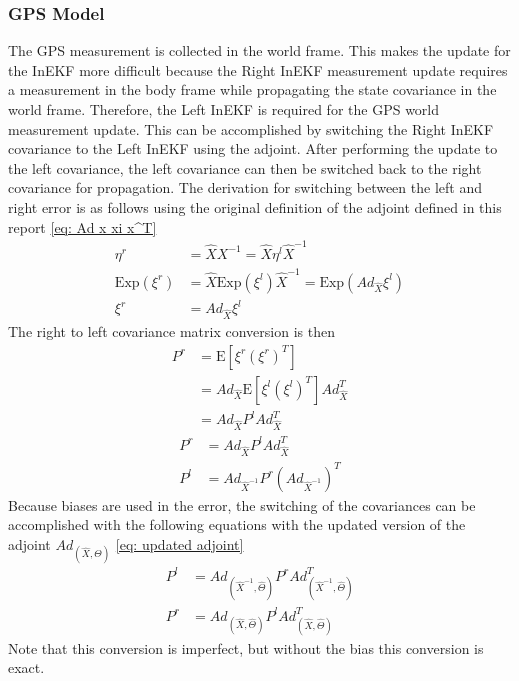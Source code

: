 \subsubsection{GPS Model}
The GPS measurement is collected in the world frame. This makes the update for the InEKF more difficult because the Right InEKF measurement update requires a measurement in the body frame while propagating the state covariance in the world frame. Therefore, the Left InEKF is required for the GPS world measurement update. This can be accomplished by switching the Right InEKF covariance to the Left InEKF using the adjoint. After performing the update to the left covariance, the left covariance can then be switched back to the right covariance for propagation. The derivation for switching between the left and right error is as follows \cite{Contact-Aided_Invarant_EKF} using the original definition of the adjoint defined in this report \eqref{eq: Ad x xi x^T} 
\begin{equation}
    \begin{split}
        \eta^r &= \hat{X} X^{-1} = \hat{X} \eta^l \hat{X}^{-1} \\
        \text{Exp}(\xi^r) &= \hat{X} \text{Exp}(\xi^l) \hat{X}^{-1} = \text{Exp}(Ad_{\hat{X}} \xi^l) \\
        \xi^r &= Ad_{\hat{X}} \xi^l
    \end{split}
    \label{eq: xi^l -> xi^r}
\end{equation}
The right to left covariance matrix conversion is then
\begin{equation}
    \begin{split}
        P^r &= \mathrm{E}[\xi^r (\xi^r)^T] \\
            &= Ad_{\hat{X}} \mathrm{E}[\xi^l (\xi^l)^T] Ad_{\hat{X}}^T \\
            &= Ad_{\hat{X}} P^l Ad_{\hat{X}}^T
        \label{eq: Adj no bias left to right}
    \end{split}
\end{equation}
\begin{equation}
    \begin{split}
        P^r &= Ad_{\hat{X}} P^l Ad_{\hat{X}}^T \\
        P^l &= Ad_{\hat{X}^{-1}} P^r (Ad_{\hat{X}^{-1}})^T 
        \label{eq: Adj no bias left to right with bias}
    \end{split}
\end{equation}
Because biases are used in the error, the switching of the covariances can be accomplished with the following equations with the updated version of the adjoint $Ad_{(\hat{X},\Theta)}$ \eqref{eq: updated adjoint}
\begin{subequations}
    \begin{align}
        P^l &= Ad_{(\hat{X}^{-1},\hat{\Theta})} P^r Ad_{(\hat{X}^{-1},\hat{\Theta})}^T 
        \label{eq: Switch covariance left/right} \\
        P^r &= Ad_{(\hat{X},\hat{\Theta})} P^l Ad_{(\hat{X},\hat{\Theta})}^T 
        \label{eq: Switch covariance right/left}
    \end{align}
\end{subequations}
Note that this conversion is imperfect, but without the bias this conversion is exact. 

